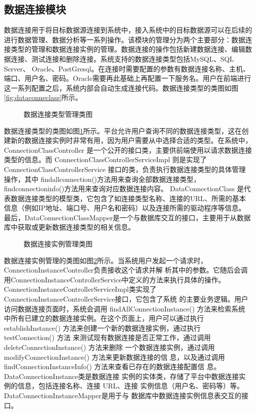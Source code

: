 \subsection{数据连接模块}
数据连接用于将目标数据源连接到系统中，接入系统中的目标数据源可以在后续的进行数据管理、数据分析等一系列操作。该模块的管理分为两个主要部分：数据连接类型的管理和数据连接实例的管理。数据连接的操作包括新建数据连接、编辑数据连接、测试连接和删除连接。系统支持的数据连接类型包括MySQL、SQL Server、
Oracle、PostGresql。在连接时需要配置的参数有数据连接名称、主机、端口、用户名、密码。Oracle需要再此基础上再配置一下服务名。用户在前端进行这一系列配置之后，系统内部会自动生成连接代码。数据连接类型的类图如图\ref{fig:dataconneclass}所示。
\begin{figure}[H]
    \centering
    \caption{数据连接类型管理类图}
    \label{fig:dataconnectypelass}
\end{figure}
数据连接类型的类图如图\ref{fig:dataconnectypelass}所示。平台允许用户查询不同的数据连接类型，这在创建新的数据连接实例时非常有用，因为用户需要从中选择合适的类型。在系统中，ConnectionClassController 是一个公开的接口类，主要供前端使用以请求数据连接类型的信息。而 ConnectionClassControllerServiceImpl 则是实现了 ConnectionClassControllerService 接口的类，负责执行数据连接类型的具体管理操作，其中
findallconnection()方法用来查询全部数据连接类型，findconnectioninfo()方法用来查询对应数据连接内容。
DataConnectionClass 是代表数据连接类型的模型类，它包含了如连接类型名称、连接的URL、所需的基本信息（例如IP地址、端口号、用户名和密码）以及连接所需的驱动程序等信息。
最后，DataConnectionClassMapper是一个与数据库交互的接口，主要用于从数据库中获取或更新数据连接类型的相关信息。
\begin{figure}[H]
    \centering
    \caption{数据连接实例管理类图}
    \label{fig:dataconnclass}
\end{figure}
数据连接实例管理的类图如图\ref{fig:dataconnclass}所示。当系统用户发起一个请求时，ConnectionInstanceController负责接收这个请求并解
析其中的参数。它随后会调用ConnectionInstanceControllerService中定义的方法来执行具体的操作。ConnectionInstanceControllerServiceImpl类实现了ConnectionInstanceControllerService接口，它包含了系统
的主要业务逻辑。用户访问数据连接页面时，系统会调用 findAllConnectionInstance()
方法来检索系统中所有已建立的数据连接实例。在这个页面上，用户可以通过执行
establishInstance() 方法来创建一个新的数据连接实例，通过执行 testConnection() 方法
来测试现有数据连接是否正常工作，通过调用 deleteConnectionInstance() 方法来删除
一个数据连接实例，通过调用 modifyConnectionInstance() 方法来更新数据连接的信
息，以及通过调用 findConnectionInstanceInfo() 方法来查看已存在的数据连接配置信
息。DataConnectionInstance类是数据连接
实例的实体类，存储了平台中数据连接实例的信息，包括连接名称、连接 URL、连接
实例信息（用户名、密码等）等。DataConnectionInstanceMapper是用于与
数据库中数据连接实例信息表交互的接口。
